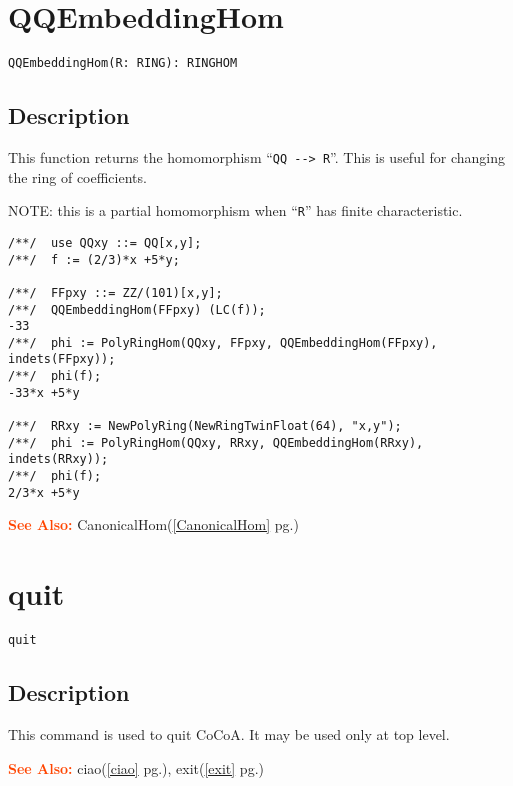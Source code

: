 \documentclass[a4paper]{mybook}
\newenvironment{command}{}{} %
\newcommand\SeeAlso{\par\textcolor{OrangeRed}{\textbf{\large See Also: }}}
\begin{document}
\section{QQEmbeddingHom}
\label{QQEmbeddingHom}
\begin{command} %


\begin{Verbatim}[label=syntax, rulecolor=\color{MidnightBlue},
frame=single]
QQEmbeddingHom(R: RING): RINGHOM
\end{Verbatim}


\subsection*{Description}

This function returns the homomorphism ``\verb&QQ --> R&''.
This is useful for changing the ring of coefficients.
\par 
NOTE: this is a partial homomorphism when ``\verb&R&'' has finite characteristic.
\begin{Verbatim}[label=example, rulecolor=\color{PineGreen}, frame=single]
/**/  use QQxy ::= QQ[x,y];
/**/  f := (2/3)*x +5*y;

/**/  FFpxy ::= ZZ/(101)[x,y];
/**/  QQEmbeddingHom(FFpxy) (LC(f));
-33
/**/  phi := PolyRingHom(QQxy, FFpxy, QQEmbeddingHom(FFpxy), indets(FFpxy));
/**/  phi(f);
-33*x +5*y

/**/  RRxy := NewPolyRing(NewRingTwinFloat(64), "x,y");
/**/  phi := PolyRingHom(QQxy, RRxy, QQEmbeddingHom(RRxy), indets(RRxy));
/**/  phi(f);
2/3*x +5*y
\end{Verbatim}


\SeeAlso %
  CanonicalHom(\ref{CanonicalHom} pg.\pageref{CanonicalHom})
\end{command} %

\section{quit}
\label{quit}
\begin{command} %


\begin{Verbatim}[label=syntax, rulecolor=\color{MidnightBlue},
frame=single]
quit
\end{Verbatim}


\subsection*{Description}

This command is used to quit CoCoA.  It may be used only at top level.

\SeeAlso %
  ciao(\ref{ciao} pg.\pageref{ciao}), 
    exit(\ref{exit} pg.\pageref{exit})
\end{command} %
\end{document}
